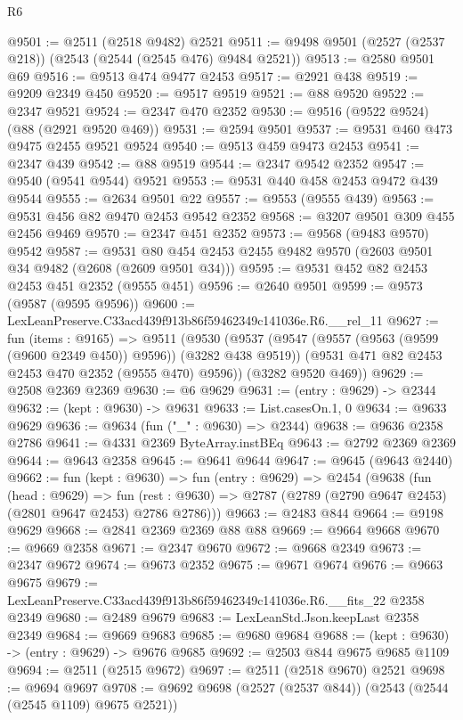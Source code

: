 \begin{lexlean}{R6}
\begin{coremodule}
@9501 := @2511 (@2518 @9482) @2521
@9511 := @9498 @9501 (@2527 (@2537 @218)) (@2543 (@2544 (@2545 @476) @9484 @2521))
@9513 := @2580 @9501 @69
@9516 := @9513 @474 @9477 @2453
@9517 := @2921 @438
@9519 := @9209 @2349 @450
@9520 := @9517 @9519
@9521 := @88 @9520
@9522 := @2347 @9521
@9524 := @2347 @470 @2352
@9530 := @9516 (@9522 @9524) (@88 (@2921 @9520 @469))
@9531 := @2594 @9501
@9537 := @9531 @460 @473 @9475 @2455 @9521 @9524
@9540 := @9513 @459 @9473 @2453
@9541 := @2347 @439
@9542 := @88 @9519
@9544 := @2347 @9542 @2352
@9547 := @9540 (@9541 @9544) @9521
@9553 := @9531 @440 @458 @2453 @9472 @439 @9544
@9555 := @2634 @9501 @22
@9557 := @9553 (@9555 @439)
@9563 := @9531 @456 @82 @9470 @2453 @9542 @2352
@9568 := @3207 @9501 @309 @455 @2456 @9469
@9570 := @2347 @451 @2352
@9573 := @9568 (@9483 @9570) @9542
@9587 := @9531 @80 @454 @2453 @2455 @9482 @9570 (@2603 @9501 @34 @9482 (@2608 (@2609 @9501 @34)))
@9595 := @9531 @452 @82 @2453 @2453 @451 @2352 (@9555 @451)
@9596 := @2640 @9501
@9599 := @9573 (@9587 (@9595 @9596))
@9600 := LexLeanPreserve.C33acd439f913b86f59462349c141036e.R6.__rel_11
@9627 := fun (items : @9165) =>
  @9511
    (@9530
      (@9537
        (@9547 (@9557 (@9563 (@9599 (@9600 @2349 @450)) @9596)) (@3282 @438 @9519))
        (@9531 @471 @82 @2453 @2453 @470 @2352 (@9555 @470) @9596))
      (@3282 @9520 @469))
@9629 := @2508 @2369 @2369
@9630 := @6 @9629
@9631 := (entry : @9629) -> @2344
@9632 := (kept : @9630) -> @9631
@9633 := List.casesOn.{1, 0}
@9634 := @9633 @9629
@9636 := @9634 (fun ("_" : @9630) => @2344)
@9638 := @9636 @2358 @2786
@9641 := @4331 @2369 ByteArray.instBEq
@9643 := @2792 @2369 @2369
@9644 := @9643 @2358
@9645 := @9641 @9644
@9647 := @9645 (@9643 @2440)
@9662 := fun (kept : @9630) =>
  fun (entry : @9629) =>
  @2454
    (@9638
      (fun (head : @9629) =>
      fun (rest : @9630) => @2787 (@2789 (@2790 @9647 @2453) (@2801 @9647 @2453) @2786 @2786)))
@9663 := @2483 @844
@9664 := @9198 @9629
@9668 := @2841 @2369 @2369 @88 @88
@9669 := @9664 @9668
@9670 := @9669 @2358
@9671 := @2347 @9670
@9672 := @9668 @2349
@9673 := @2347 @9672
@9674 := @9673 @2352
@9675 := @9671 @9674
@9676 := @9663 @9675
@9679 := LexLeanPreserve.C33acd439f913b86f59462349c141036e.R6.__fits_22 @2358 @2349
@9680 := @2489 @9679
@9683 := LexLeanStd.Json.keepLast @2358 @2349
@9684 := @9669 @9683
@9685 := @9680 @9684
@9688 := (kept : @9630) -> (entry : @9629) -> @9676 @9685
@9692 := @2503 @844 @9675 @9685 @1109
@9694 := @2511 (@2515 @9672)
@9697 := @2511 (@2518 @9670) @2521
@9698 := @9694 @9697
@9708 := @9692 @9698 (@2527 (@2537 @844)) (@2543 (@2544 (@2545 @1109) @9675 @2521))

\end{coremodule}
\end{lexlean}
